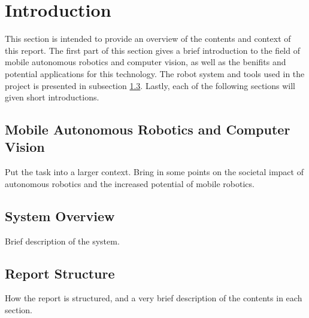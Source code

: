\section{Introduction}

This section is intended to provide an overview of the contents and context of this report. The first part of this section gives a brief introduction to the field of mobile autonomous robotics and computer vision, as well as the benifits and potential applications for this technology. The robot system and tools used in the project is presented in subsection \ref{}. Lastly, each of the following sections will given short introductions.

  
\subsection{Mobile Autonomous Robotics and Computer Vision}

Put the task into a larger context. Bring in some points on the societal impact of autonomous robotics and the increased potential of mobile robotics.  

\subsection{System Overview}

Brief description of the system.



\subsection{Report Structure}
How the report is structured, and a very brief description of the contents in each section.
